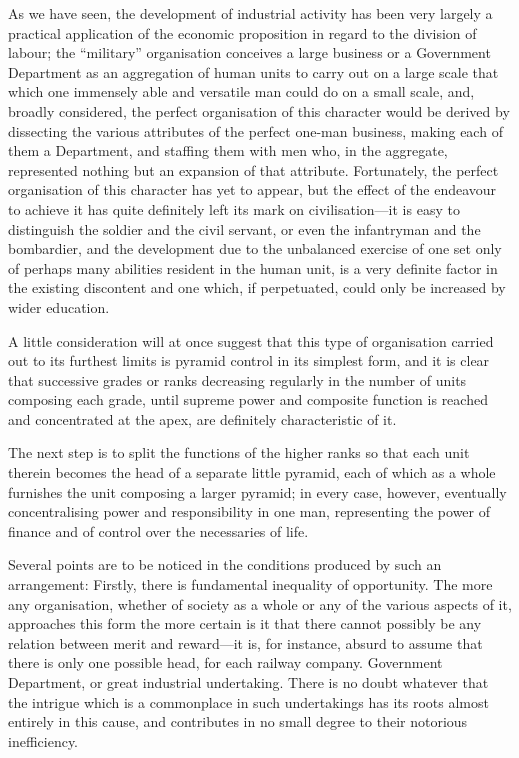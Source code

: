 \documentclass{book}
\begin{document}
As we have seen, the development of industrial activity has been very largely a practical application of the economic proposition in regard to the division of labour; the “military” organisation conceives a large business or a Government Department as an aggregation of human units to carry out on a large scale that which one immensely able and versatile man could do on a small scale, and, broadly considered, the perfect organisation of this character would be derived by dissecting the various attributes of the perfect one-man business, making each of them a Department, and staffing them with men who, in the aggregate, represented nothing but an expansion of that attribute. Fortunately, the perfect organisation of this character has yet to appear, but the effect of the endeavour to achieve it has quite definitely left its mark on civilisation—it is easy to distinguish the soldier and the civil servant, or even the infantryman and the bombardier, and the development due to the unbalanced exercise of one set only of perhaps many abilities resident in the human unit, is a very definite factor in the existing discontent and one which, if perpetuated, could only be increased by wider education.

A little consideration will at once suggest that this type of organisation carried out to its furthest limits is pyramid control in its simplest form, and it is clear that successive grades or ranks decreasing regularly in the number of units composing each grade, until supreme power and composite function is reached and concentrated at the apex, are definitely characteristic of it.

The next step is to split the functions of the higher ranks so that each unit therein becomes the head of a separate little pyramid, each of which as a whole furnishes the unit composing a larger pyramid; in every case, however, eventually concentralising power and responsibility in one man, representing the power of finance and of control over the necessaries of life.

Several points are to be noticed in the conditions produced by such an arrangement: Firstly, there is fundamental inequality of opportunity. The more any organisation, whether of society as a whole or any of the various aspects of it, approaches this form the more certain is it that there cannot possibly be any relation between merit and reward—it is, for instance, absurd to assume that there is only one possible head, for each railway company. Government Department, or great industrial undertaking. There is no doubt whatever that the intrigue which is a commonplace in such undertakings has its roots almost entirely in this cause, and contributes in no small degree to their notorious inefficiency.
\end{document}
